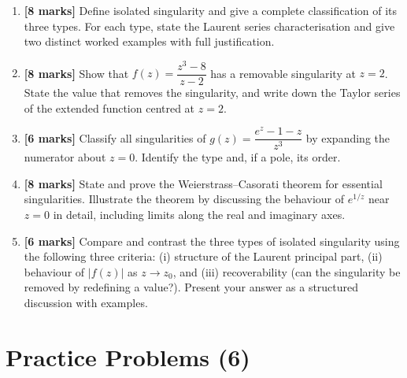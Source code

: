 \documentclass[12pt,a4paper]{article}
\begin{document}
\begin{enumerate}[label=\textbf{D\arabic*.}, leftmargin=2.5em]

\item \textbf{[8 marks]} Define isolated singularity and give a complete classification of its
three types. For each type, state the Laurent series characterisation and give two distinct worked
examples with full justification.

\item \textbf{[8 marks]} Show that $f(z) = \dfrac{z^3 - 8}{z - 2}$ has a removable singularity
at $z = 2$. State the value that removes the singularity, and write down the Taylor series of the
extended function centred at $z = 2$.

\item \textbf{[6 marks]} Classify all singularities of
$g(z) = \dfrac{e^z - 1 - z}{z^3}$
by expanding the numerator about $z = 0$. Identify the type and, if a pole, its order.

\item \textbf{[8 marks]} State and prove the Weierstrass--Casorati theorem for essential
singularities. Illustrate the theorem by discussing the behaviour of $e^{1/z}$ near $z = 0$ in
detail, including limits along the real and imaginary axes.

\item \textbf{[6 marks]} Compare and contrast the three types of isolated singularity using the
following three criteria: (i) structure of the Laurent principal part, (ii) behaviour of $|f(z)|$
as $z \to z_0$, and (iii) recoverability (can the singularity be removed by redefining a value?).
Present your answer as a structured discussion with examples.

\end{enumerate}

\section{Practice Problems (6)}
\end{document}
